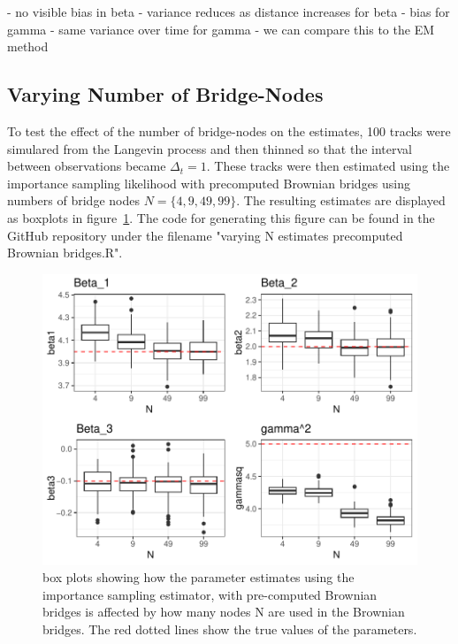 - no visible bias in beta
- variance reduces as distance increases for beta
- bias for gamma
- same variance over time for gamma
- we can compare this to the EM method


\subsection{Varying Number of Bridge-Nodes}
To test the effect of the number of bridge-nodes on the estimates, 100 tracks were simulared from the Langevin process and then thinned so that the interval between observations became $\Delta_t =1$. These tracks were then estimated using the importance sampling likelihood with precomputed Brownian bridges using numbers of bridge nodes $N =\{4,9,49,99\}$. The resulting estimates are displayed as boxplots in figure~\ref{fig: varying N boxplots precomputed brownian bridge}. The code for generating this figure can be found in the GitHub repository under the filename "varying N estimates precomputed Brownian bridges.R".


\begin{figure}[H]
    \centering
    \includegraphics[width=\linewidth]{Images/Results/varying N estimates.pdf}
    \caption[Box plots of Parameter Estimates for various Ns]{box plots showing how the parameter estimates using the importance sampling estimator, with pre-computed Brownian bridges is affected by how many nodes N are used in the Brownian bridges. The red dotted lines show the true values of the parameters.}
    \label{fig: varying N boxplots precomputed brownian bridge}
\end{figure}

